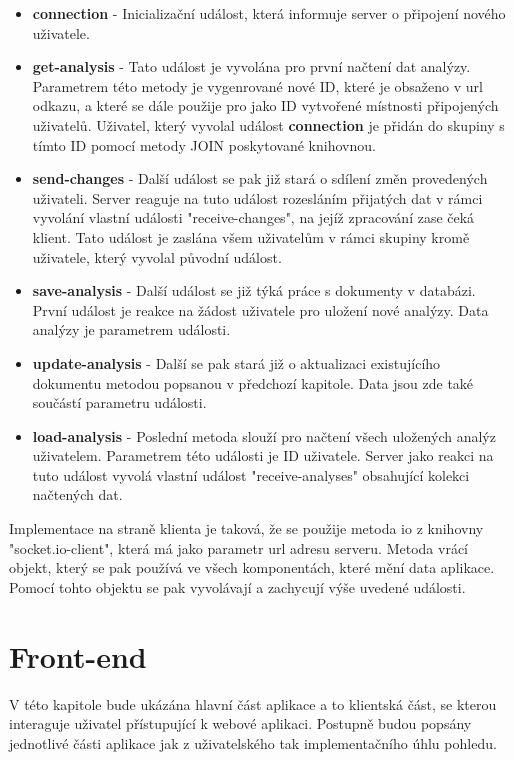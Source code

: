\begin{itemize}
    \item \textbf{connection} - Inicializační událost, která informuje server o připojení nového uživatele.
    \item \textbf{get-analysis} - Tato událost je vyvolána pro první načtení dat analýzy. Parametrem této metody je vygenrované nové ID, které je obsaženo v url odkazu, a které se dále použije pro jako ID vytvořené místnosti připojených uživatelů. Uživatel, který vyvolal událost \textbf{connection} je přidán do skupiny s tímto ID pomocí metody JOIN poskytované knihovnou. 
    \item \textbf{send-changes} - Další událost se pak již stará o sdílení změn provedených uživateli. Server reaguje na tuto událost rozesláním přijatých dat v rámci vyvolání vlastní události "receive-changes", na jejíž zpracování zase čeká klient. Tato událost je zaslána všem uživatelům v rámci skupiny kromě uživatele, který vyvolal původní událost. 
    \item \textbf{save-analysis} - Další událost se již týká práce s dokumenty v databázi. První událost je reakce na žádost uživatele pro uložení nové analýzy. Data analýzy je parametrem události.  
    \item \textbf{update-analysis} - Další se pak stará již o aktualizaci existujícího dokumentu metodou popsanou v předchozí kapitole. Data jsou zde také součástí parametru události. 
      \item \textbf{load-analysis} - Poslední metoda slouží pro načtení všech uložených analýz uživatelem. Parametrem této události je ID uživatele. Server jako reakci na tuto událost vyvolá vlastní událost "receive-analyses" obsahující kolekci načtených dat. 
\end{itemize}

Implementace na straně klienta je taková, že se použije metoda io z knihovny "socket.io-client", která má jako parametr url adresu serveru. Metoda vrácí objekt, který se pak používá ve všech komponentách, které mění data aplikace. Pomocí tohto objektu se pak vyvolávají a zachycují výše uvedené události. 



\section{Front-end}
V této kapitole bude ukázána hlavní část aplikace a to klientská část, se kterou interaguje uživatel přístupující k webové aplikaci. Postupně budou popsány jednotlivé části aplikace jak z uživatelského tak implementačního úhlu pohledu. 

